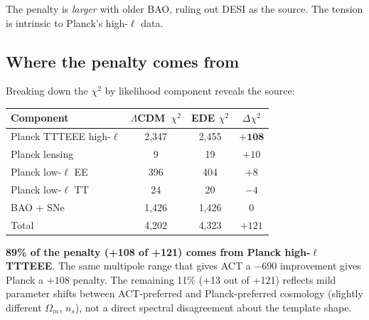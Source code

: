 \documentclass[onecolumn,showpacs,preprintnumbers,amsmath,amssymb,prd]{revtex4-2}
\newcommand{\lcdm}{$\Lambda$CDM}
\begin{document}
The penalty is \emph{larger} with older BAO, ruling out DESI as the source. 
The tension is intrinsic to Planck's high-$\ell$ data.

\subsection{Where the penalty comes from}

Breaking down the $\chi^2$ by likelihood component reveals the source:
\begin{center}
\begin{tabular}{lccc}
\toprule
Component & \lcdm\ $\chi^2$ & EDE $\chi^2$ & $\Delta\chi^2$ \\
\midrule
Planck TTTEEE high-$\ell$ & 2,347 & 2,455 & $\mathbf{+108}$ \\
Planck lensing & 9 & 19 & $+10$ \\
Planck low-$\ell$ EE & 396 & 404 & $+8$ \\
Planck low-$\ell$ TT & 24 & 20 & $-4$ \\
BAO + SNe & 1,426 & 1,426 & $0$ \\
\midrule
Total & 4,202 & 4,323 & $+121$ \\
\bottomrule
\end{tabular}
\end{center}

\textbf{89\% of the penalty (+108 of +121) comes from Planck high-$\ell$ 
TTTEEE}. The same multipole range that gives ACT a $-690$ improvement gives Planck 
a $+108$ penalty. The remaining 11\% (+13 out of +121) reflects mild parameter 
shifts between ACT-preferred and Planck-preferred cosmology (slightly different 
$\Omega_m$, $n_s$), not a direct spectral disagreement about the template shape.
\end{document}
